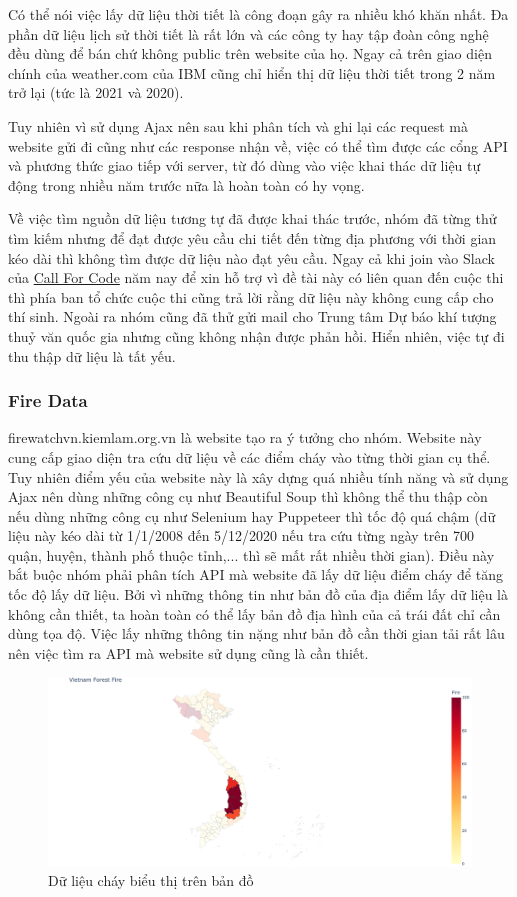 \documentclass{article}
\begin{document}
Có thể nói việc lấy dữ liệu thời tiết là công đoạn gây ra nhiều khó khăn nhất. Đa phần dữ liệu lịch sử thời tiết là rất lớn và các công ty hay tập đoàn công nghệ đều dùng để bán chứ không public trên website của họ. Ngay cả trên giao diện chính của weather.com của IBM cũng chỉ hiển thị dữ liệu thời tiết trong 2 năm trở lại (tức là 2021 và 2020).

Tuy nhiên vì sử dụng Ajax nên sau khi phân tích và ghi lại các request mà website gửi đi cũng như các response nhận về, việc có thể tìm được các cổng API và phương thức giao tiếp với server, từ đó dùng vào việc khai thác dữ liệu tự động trong nhiều năm trước nữa là hoàn toàn có hy vọng.

Về việc tìm nguồn dữ liệu tương tự đã được khai thác trước, nhóm đã từng thử tìm kiếm nhưng để đạt được yêu cầu chi tiết đến từng địa phương với thời gian kéo dài thì không tìm được dữ liệu nào đạt yêu cầu. Ngay cả khi join vào Slack của \href{https://callforcode.org/}{Call For Code} năm nay để xin hỗ trợ vì đề tài này có liên quan đến cuộc thi thì phía ban tổ chức cuộc thi cũng trả lời rằng dữ liệu này không cung cấp cho thí sinh. Ngoài ra nhóm cũng đã thử gửi mail cho Trung tâm Dự báo khí tượng thuỷ văn quốc gia nhưng cũng không nhận được phản hồi. Hiển nhiên, việc tự đi thu thập dữ liệu là tất yếu.

\subsubsection{Fire Data}
\qquad firewatchvn.kiemlam.org.vn là website tạo ra ý tưởng cho nhóm. Website này cung cấp giao diện tra cứu dữ liệu về các điểm cháy vào từng thời gian cụ thể. Tuy nhiên điểm yếu của website này là xây dựng quá nhiều tính năng và sử dụng Ajax nên dùng những công cụ như Beautiful Soup thì không thể thu thập còn nếu dùng những công cụ như Selenium hay Puppeteer thì tốc độ quá chậm (dữ liệu này kéo dài từ 1/1/2008 đến 5/12/2020 nếu tra cứu từng ngày trên 700 quận, huyện, thành phố thuộc tỉnh,... thì sẽ mất rất nhiều thời gian). Điều này bắt buộc nhóm phải phân tích API mà website đã lấy dữ liệu điểm cháy để tăng tốc độ lấy dữ liệu. Bởi vì những thông tin như bản đồ của địa điểm lấy dữ liệu là không cần thiết, ta hoàn toàn có thể lấy bản đồ địa hình của cả trái đất chỉ cần dùng tọa độ. Việc lấy những thông tin nặng như bản đồ cần thời gian tải rất lâu nên việc tìm ra API mà website sử dụng cũng là cần thiết.

\begin{figure}[H]
	\centering
	\includegraphics[width=6in]{./WildfireVisualization/TayNguyen.png}
	\caption{Dữ liệu cháy biểu thị trên bản đồ}
\end{figure}
\end{document}
